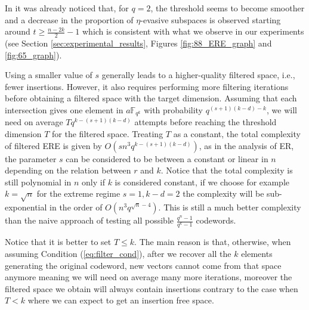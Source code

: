 \documentclass{article}
\newcommand{\Fqk}{\mathbb{F}_{q^k}}
\begin{document}
In \cite[Figure 2]{gruica2024generalised} it was already noticed that, for $q=2$, the threshold seems to become smoother and a decrease in the proportion of $\eta$-evasive subspaces is observed starting around $t \geq \frac{n-2k}{2} - 1$ which is consistent with what we observe in our experiments (see Section \ref{sec:experimental_results}, Figures \ref{fig:88_ERE_graph} and \ref{fig:65_graph}). 
\\
\par Using a smaller value of $s$ generally leads to a higher-quality filtered space, i.e., fewer insertions. However, it also requires performing more filtering iterations before obtaining a filtered space with the target dimension.
Assuming that each intersection gives one element in $a\Fqk$ with probability $q^{(s+1)(k-d)-k}$, we will need on average $T q^{k - (s+1)(k-d)}$ attempts before reaching the threshold dimension $T$ for the filtered space.
Treating $T$ as a constant, the total complexity of filtered ERE is given by $O(sn^{3} q^{k-(s+1)(k-d)})$, as in the analysis of ER, the parameter $s$ can be considered to be between a constant or linear in $n$ depending on the relation between $r$ and $k$. 
Notice that the total complexity is still polynomial in $n$ only if $k$ is considered constant, if we choose for example $k = \sqrt{n}$ for the extreme regime $s=1, k-d = 2 $ the complexity will be sub-exponential in the order of $O(n^3 q^{\sqrt{n} - 4})$.
This is still a much better complexity than the naive approach of testing all possible $\frac{q^n - 1}{q^k - 1}$ codewords.


Notice that it is better to set $T \leq k$.
The main reason is that, otherwise, when assuming Condition (\ref{eq:filter_cond}), after we recover all the $k$ elements generating the original codeword, new vectors cannot come from that space anymore meaning we will need on average many more iterations, moreover the filtered space we obtain will always contain insertions contrary to the case when $T< k$ where we can expect to get an insertion free space.
\end{document}
